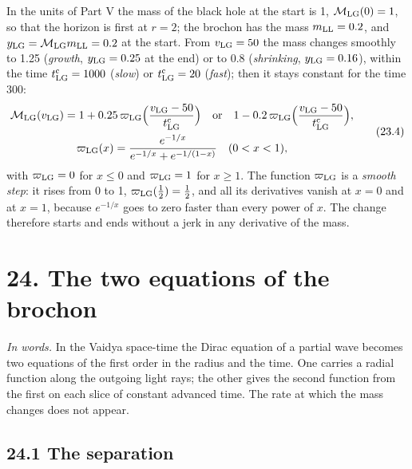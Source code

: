 \documentclass[
  10pt,
]{article}
\begin{document}
In the units of Part V the mass of the black hole at the start is 1,
\(\mathcal M_{\rm LG}(0)=1\), so that the horizon is first at \(r=2\);
the brochon has the mass \(m_{\rm LL}=0.2\), and
\(y_{\rm LG}=\mathcal M_{\rm LG}m_{\rm LL}=0.2\) at the start. From
\(v_{\rm LG}=50\) the mass changes smoothly to 1.25 (\emph{growth},
\(y_{\rm LG}=0.25\) at the end) or to 0.8 (\emph{shrinking},
\(y_{\rm LG}=0.16\)), within the time \(t^{\rm c}_{\rm LG}=1000\)
(\emph{slow}) or \(t^{\rm c}_{\rm LG}=20\) (\emph{fast}); then it stays
constant for the time 300:
\[\begin{gathered}\mathcal M_{\rm LG}(v_{\rm LG})=1+0.25\,\varpi_{\rm LG}\Big(\frac{v_{\rm LG}-50}{t^{\rm c}_{\rm LG}}\Big)\quad\text{or}\quad1-0.2\,\varpi_{\rm LG}\Big(\frac{v_{\rm LG}-50}{t^{\rm c}_{\rm LG}}\Big),\\\varpi_{\rm LG}(x)=\frac{e^{-1/x}}{e^{-1/x}+e^{-1/(1-x)}}\quad(0<x<1),\end{gathered}\tag{23.4}\]
with \(\varpi_{\rm LG}=0\) for \(x\le0\) and \(\varpi_{\rm LG}=1\) for
\(x\ge1\). The function \(\varpi_{\rm LG}\) is a \emph{smooth step}: it
rises from 0 to 1, \(\varpi_{\rm LG}(\tfrac12)=\tfrac12\), and all its
derivatives vanish at \(x=0\) and at \(x=1\), because \(e^{-1/x}\) goes
to zero faster than every power of \(x\). The change therefore starts
and ends without a jerk in any derivative of the mass.

\hypertarget{the-two-equations-of-the-brochon}{%
\section{24. The two equations of the
brochon}\label{the-two-equations-of-the-brochon}}

\emph{In words.} In the Vaidya space-time the Dirac equation of a
partial wave becomes two equations of the first order in the radius and
the time. One carries a radial function along the outgoing light rays;
the other gives the second function from the first on each slice of
constant advanced time. The rate at which the mass changes does not
appear.

\hypertarget{the-separation}{%
\subsection{24.1 The separation}\label{the-separation}}
\end{document}
